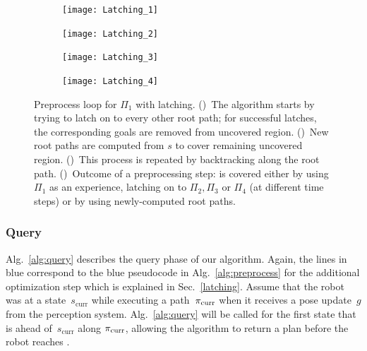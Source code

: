 \documentclass[a4paper]{report}
\begin{document}
\begin{figure}[t]
    \centering
    \begin{subfigure}{.48\textwidth}
        \texttt{[image: Latching\_1]}
        \caption{}
        \label{fig:pl1}
    \end{subfigure}
    \begin{subfigure}{.48\textwidth}
        \texttt{[image: Latching\_2]}
        \caption{}
        \label{fig:pl2}
    \end{subfigure} 
    \begin{subfigure}{.48\textwidth}
        \texttt{[image: Latching\_3]}
        \caption{}
        \label{fig:pl3}
    \end{subfigure}
    \begin{subfigure}{.48\textwidth}
        \texttt{[image: Latching\_4]}
        \caption{}
        \label{fig:pl4}
    \end{subfigure}
    \caption{\CaptionTextSize
    Preprocess loop for $\Pi_1$ with latching.
    ()~The algorithm starts by trying to latch on to every other root path; for successful latches, the corresponding goals are removed from uncovered region.
    ()~New root paths are computed from $s$ to cover remaining uncovered region.
    ()~This process is repeated by backtracking along the root path.
    ()~Outcome of a preprocessing step: \Gfull is covered either by using $\Pi_1$ as an experience, 
    latching on to $\Pi_2,\Pi_3$ or  $\Pi_4$ (at different time steps)
    or by 
    using newly-computed root paths. 
    }
    \label{fig:pl_latching}
\end{figure}

\subsubsection{Query}
Alg.~\ref{alg:query} describes the query phase of our algorithm. Again, the lines in blue correspond to the blue pseudocode in Alg.~\ref{alg:preprocess} for the additional optimization step which is explained in Sec.~\ref{latching}.
Assume that the robot was at a state~$s_{\textrm{curr}}$ while executing a path~$\pi_{\rm curr}$ when it receives a pose update~$g$ from the perception system. Alg.~\ref{alg:query} will be called for the first state \Sstart that is \Tbound ahead of~$s_{\textrm{curr}}$ along $\pi_{\rm curr}$, allowing the algorithm to return a plan before the robot reaches \Sstart.
\end{document}
